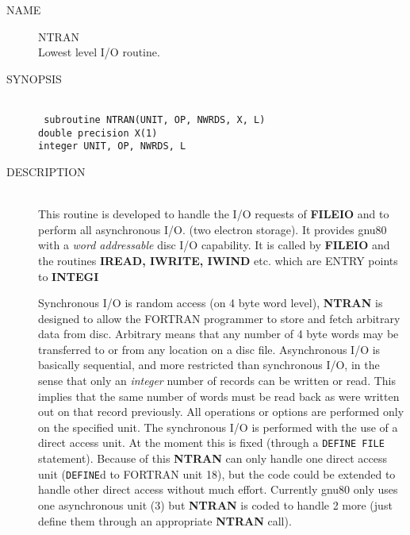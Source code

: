 
\newpage
\setcounter{page}{1}
\begin{description}
\item[NAME] NTRAN \\
Lowest level I/O routine.
\item[SYNOPSIS] \ \\
{\tt
   subroutine NTRAN(UNIT, OP, NWRDS, X, L) \\
   double precision X(1) \\
   integer UNIT, OP, NWRDS, L \\
}
\item[DESCRIPTION] \ \\
This routine is developed to handle the I/O requests of {\bf FILEIO} and
to perform all asynchronous I/O. (two electron storage).  It provides
gnu80 with a {\em word addressable} disc I/O capability.  It is called
by {\bf FILEIO} and the routines {\bf IREAD, IWRITE, IWIND} etc. 
which are ENTRY points to {\bf INTEGI}

\begin{center}
\end{center}

Synchronous I/O is random access (on 4 byte word level),
{\bf NTRAN} is designed to allow the FORTRAN programmer to store and
fetch arbitrary data from disc.  Arbitrary means that any 
number of 4 byte words may be transferred to or from any location
on a disc file.
Asynchronous I/O is basically sequential, and more restricted
than synchronous I/O, in the sense that only an {\em integer} number
of records can be written or read. This implies that 
the same number of words must be read back as were written out on that
record previously.
All operations or options are performed only on the specified
unit.
The synchronous I/O is performed with the use of a direct access unit.
At the moment this is fixed (through a {\tt DEFINE FILE}
statement). Because of this {\bf NTRAN} can only handle one direct access
unit ({\tt DEFINE}d to FORTRAN unit  18), but the code could be extended to
handle other direct access without much effort.  Currently gnu80
only uses one asynchronous unit (3) but {\bf NTRAN} is coded to handle 2
more (just define them through an appropriate {\bf NTRAN} call).


\end{description}
